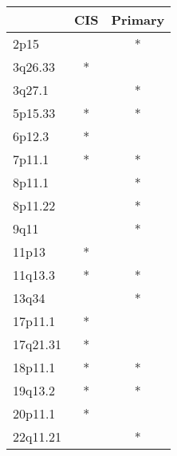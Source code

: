 \begin{tabular}{lcc}
\toprule
{} & CIS & Primary \\
\midrule
2p15     &     &       * \\
3q26.33  &   * &         \\
3q27.1   &     &       * \\
5p15.33  &   * &       * \\
6p12.3   &   * &         \\
7p11.1   &   * &       * \\
8p11.1   &     &       * \\
8p11.22  &     &       * \\
9q11     &     &       * \\
11p13    &   * &         \\
11q13.3  &   * &       * \\
13q34    &     &       * \\
17p11.1  &   * &         \\
17q21.31 &   * &         \\
18p11.1  &   * &       * \\
19q13.2  &   * &       * \\
20p11.1  &   * &         \\
22q11.21 &     &       * \\
\bottomrule
\end{tabular}
